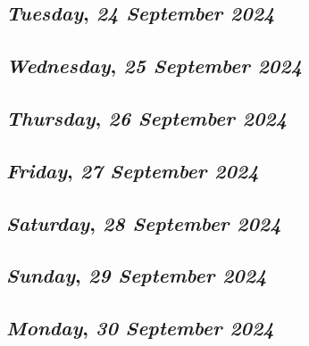 \def\day{\textit{24 September 2024}}
\def\weekday{\textit{Tuesday}}
\subsection*{\weekday, \day}

\def\day{\textit{25 September 2024}}
\def\weekday{\textit{Wednesday}}
\subsection*{\weekday, \day}

\def\day{\textit{26 September 2024}}
\def\weekday{\textit{Thursday}}
\subsection*{\weekday, \day}

\def\day{\textit{27 September 2024}}
\def\weekday{\textit{Friday}}
\subsection*{\weekday, \day}

\def\day{\textit{28 September 2024}}
\def\weekday{\textit{Saturday}}
\subsection*{\weekday, \day}

\def\day{\textit{29 September 2024}}
\def\weekday{\textit{Sunday}}
\subsection*{\weekday, \day}

\def\day{\textit{30 September 2024}}
\def\weekday{\textit{Monday}}
\subsection*{\weekday, \day}